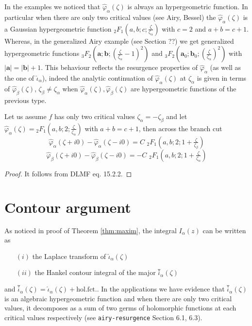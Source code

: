 \documentclass[11pt,a4paper,twoside,leqno,noamsfonts]{amsart}
\numberwithin{equation}{section}
\begin{document}
In the examples we noticed that $\hat{\varphi}_{\alpha}(\zeta)$ is always an hypergeometric function. In particular when there are only two critical values (see Airy, Bessel) the $\hat{\varphi}_{\alpha}(\zeta)$ is a Gaussian hypergeometric function ${}_2F_1\left(a,b;c;\tfrac{\zeta}{\zeta_\alpha}\right)$ with $c=2$ and $a+b=c+1$. Whereas, in the generalized Airy example (see Section ??) we get generalized hypergeometric functions ${}_3F_2\left(\mathbf{a};\mathbf{b};(\tfrac{\zeta}{\zeta_\alpha}-1)^2\right)$ and ${}_3F_2\left(\mathbf{a}_0;\mathbf{b}_0;(\tfrac{\zeta}{\zeta_\alpha})^2\right)$ with $|\mathbf{a}|=|\mathbf{b}|+1$. This behaviour reflects the resurgence properties of $\hat{\varphi}_{\alpha}$ (as well as the one of $\hat
{\iota}_{\alpha}$), indeed the analytic continuation of $\hat{\varphi}_{\alpha}(\zeta)$ at $\zeta_\alpha$ is given in terms of $\hat{\varphi}_{\beta}(\zeta)$, $\zeta_\beta\neq\zeta_\alpha$ when $\hat{\varphi}_{\alpha}(\zeta), \hat{\varphi}_{\beta}(\zeta)$ are hypergeometric functions of the previous type.

\begin{lemma}
Let us assume $f$ has only two critical values $\zeta_\alpha=-\zeta_\beta$ and let $\hat{\varphi}_{\alpha}(\zeta)={}_2F_1(a,b;2;\tfrac{\zeta}{\zeta_\alpha})$ with $a+b=c+1$, then across the branch cut 
\begin{equation}
\hat{\varphi}_{\alpha}(\zeta+i0)-\hat{\varphi}_{\alpha}(\zeta-i0)=C\,\,{}_2F_1\left(a,b;2;1+\tfrac{\zeta}{\zeta_{\beta}}\right)
\end{equation}
\begin{equation}
\hat{\varphi}_{\beta}(\zeta+i0)-\hat{\varphi}_{\beta}(\zeta-i0)=-C\,\,{}_2F_1\left(a,b;2;1+\tfrac{\zeta}{\zeta_{\alpha}}\right)
\end{equation}
\end{lemma}
\begin{proof}
It follows from DLMF eq. 15.2.2. 
\end{proof} 

\section{Contour argument}

As noticed in proof of Theorem \ref{thm:maxim}, the integral $I_{\alpha}(z)$ can be written as 
\begin{enumerate}
\item[$(i)$] the Laplace transform of $\hat{\iota}_{\alpha}(\zeta)$
\item[$(ii)$] the Hankel contour integral of the major $\overset{\triangledown}{\iota}_\alpha(\zeta)$
\end{enumerate}
and $\overset{\triangledown}{\iota}_\alpha(\zeta)=\hat{
\iota}_{\alpha}(\zeta)+\text{hol.fct.}$. In the applications we have evidence that $\overset{\triangledown}{\iota}_\alpha(\zeta)$ is an algebraic hypergeometric function and when there are only two critical values, it decomposes as a sum of two germs of holomorphic functions at each critical values respectively (see {\tt airy-resurgence} Section 6.1, 6.3).    
\end{document}

